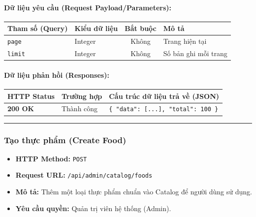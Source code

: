 \documentclass[12pt,a4paper]{article}
\begin{document}
\paragraph{Dữ liệu yêu cầu (Request Payload/Parameters):}
\begin{longtable}{|>{\raggedright\arraybackslash}p{2.8cm}|>{\raggedright\arraybackslash}p{2.2cm}|c|>{\raggedright\arraybackslash}p{7.0cm}|}
\hline
\textbf{Tham số (Query)} & \textbf{Kiểu dữ liệu} & \textbf{Bắt buộc} & \textbf{Mô tả} \\ \hline
\endhead
\texttt{page} & Integer & Không & Trang hiện tại \\ \hline
\texttt{limit} & Integer & Không & Số bản ghi mỗi trang \\ \hline
\end{longtable}

\paragraph{Dữ liệu phản hồi (Responses):}
\begin{longtable}{|>{\raggedright\arraybackslash}p{2.8cm}|>{\raggedright\arraybackslash}p{3.2cm}|>{\raggedright\arraybackslash}p{8.0cm}|}
\hline
\textbf{HTTP Status} & \textbf{Trường hợp} & \textbf{Cấu trúc dữ liệu trả về (JSON)} \\ \hline
\endhead
\textbf{200 OK} & Thành công & \texttt{\{ "data": [...], "total": 100 \}} \\ \hline
\end{longtable}

\vskip 0.4cm
\noindent\rule{\textwidth}{0.3pt}
\vskip 0.4cm

\subsubsection{Tạo thực phẩm (Create Food)}
\begin{itemize}[leftmargin=*]
    \item \textbf{HTTP Method:} \texttt{POST}
    \item \textbf{Request URL:} \texttt{/api/admin/catalog/foods}
    \item \textbf{Mô tả:} Thêm một loại thực phẩm chuẩn vào Catalog để người dùng sử dụng.
    \item \textbf{Yêu cầu quyền:} Quản trị viên hệ thống (Admin).
\end{itemize}
\end{document}
